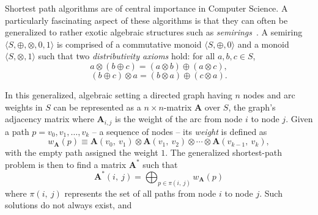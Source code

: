 Shortest path algorithms are of central importance in Computer Science.
A particularly fascinating aspect of these algorithms is
that they can often be generalized to rather exotic algebraic structures
such as \emph{semirings}~\cite{gondran_graphs_2008}.
A semiring $\langle S, \oplus, \otimes, 0, 1 \rangle$ is
comprised of a commutative monoid $\langle S, \oplus, 0\rangle$
and a monoid $\langle S, \otimes, 1\rangle$ such that
two \emph{distributivity axioms} hold:
for all $a, b, c \in S$,
\begin{equation}
\label{eq:left:distributivity}
    a\otimes (b \oplus c) = (a\otimes b) \oplus (a\otimes c),
\end{equation}
\begin{equation}
\label{eq:right:distributivity}
    (b \oplus c) \otimes a = (b\otimes a) \oplus (c\otimes a).
\end{equation}

In this generalized, algebraic setting a directed graph having $n$ nodes and arc weights in $S$
can be represented as a $n\times n$-matrix $\mathbf{A}$ over $S$, the graph's
adjacency matrix where \(\mathbf{A}_{i,j}\) is the weight of the arc from node \(i\) to node \(j\).
Given a path $p = v_0, v_1, \ldots, v_k$ -- a sequence of nodes -- its \emph{weight}
is defined as
\begin{equation}
\label{eq:def:weight}
    w_{\mathbf{A}}(p)
    \equiv
    \mathbf{A}(v_0,\ v_1)
    \otimes \mathbf{A}(v_1,\ v_2)
    \otimes \cdots
    \otimes \mathbf{A}(v_{k-1},\ v_k),
\end{equation}
with the empty path assigned the weight $1$.
The generalized shortest-path problem is then to find
a matrix $\mathbf{A}^*$ such that
\begin{equation}
\label{eq:global}
\mathbf{A}^*(i,\ j) = \displaystyle\bigoplus_{p \in \pi(i,\ j)} w_{\mathbf{A}}(p)
\end{equation}
where $\pi(i,\ j)$ represents the set of all paths from node $i$ to node $j$.
Such solutions do not always exist, and 

